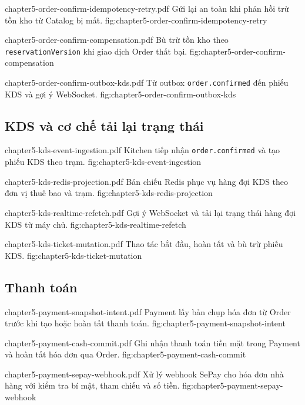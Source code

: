 \extendeddiagramfigure{0.72\textheight}
  {chapter5-order-confirm-idempotency-retry.pdf}
  {Gửi lại an toàn khi phản hồi trừ tồn kho từ Catalog bị mất.}
  {fig:chapter5-order-confirm-idempotency-retry}

\extendeddiagramfigure{0.72\textheight}
  {chapter5-order-confirm-compensation.pdf}
  {Bù trừ tồn kho theo \texttt{reservationVersion} khi giao dịch Order thất bại.}
  {fig:chapter5-order-confirm-compensation}

\extendeddiagramfigure{0.72\textheight}
  {chapter5-order-confirm-outbox-kds.pdf}
  {Từ outbox \texttt{order.confirmed} đến phiếu KDS và gợi ý WebSocket.}
  {fig:chapter5-order-confirm-outbox-kds}

\subsection{KDS và cơ chế tải lại trạng thái}

\extendeddiagramfigure{0.72\textheight}
  {chapter5-kds-event-ingestion.pdf}
  {Kitchen tiếp nhận \texttt{order.confirmed} và tạo phiếu KDS theo trạm.}
  {fig:chapter5-kds-event-ingestion}

\extendeddiagramfigure{0.72\textheight}
  {chapter5-kds-redis-projection.pdf}
  {Bản chiếu Redis phục vụ hàng đợi KDS theo đơn vị thuê bao và trạm.}
  {fig:chapter5-kds-redis-projection}

\extendeddiagramfigure{0.72\textheight}
  {chapter5-kds-realtime-refetch.pdf}
  {Gợi ý WebSocket và tải lại trạng thái hàng đợi KDS từ máy chủ.}
  {fig:chapter5-kds-realtime-refetch}

\extendeddiagramfigure{0.72\textheight}
  {chapter5-kds-ticket-mutation.pdf}
  {Thao tác bắt đầu, hoàn tất và bù trừ phiếu KDS.}
  {fig:chapter5-kds-ticket-mutation}

\subsection{Thanh toán}

\extendeddiagramfigure{0.72\textheight}
  {chapter5-payment-snapshot-intent.pdf}
  {Payment lấy bản chụp hóa đơn từ Order trước khi tạo hoặc hoàn tất thanh toán.}
  {fig:chapter5-payment-snapshot-intent}

\extendeddiagramfigure{0.72\textheight}
  {chapter5-payment-cash-commit.pdf}
  {Ghi nhận thanh toán tiền mặt trong Payment và hoàn tất hóa đơn qua Order.}
  {fig:chapter5-payment-cash-commit}

\extendeddiagramfigure{0.72\textheight}
  {chapter5-payment-sepay-webhook.pdf}
  {Xử lý webhook SePay cho hóa đơn nhà hàng với kiểm tra bí mật, tham chiếu và số tiền.}
  {fig:chapter5-payment-sepay-webhook}

